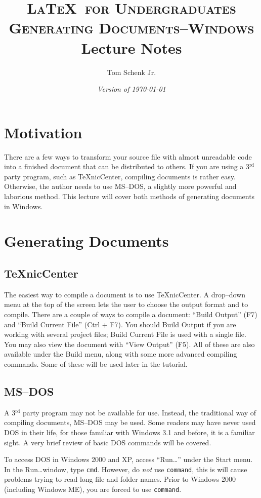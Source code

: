 \documentclass{article}
\title{\textsc{\LaTeX\ for Undergraduates\\
			Generating Documents--Windows} \\
			Lecture Notes}
\author{Tom Schenk Jr.}
\date{\textit{Version of \today}}
\begin{document}
\maketitle

\section{Motivation}

There are a few ways to transform your source file with almost unreadable code into a finished document that can be distributed to others. If you are using a 3$^{\textrm{rd}}$ party program, such as \TeX nicCenter, compiling documents is rather easy. Otherwise, the author needs to use MS--DOS, a slightly more powerful and laborious method. This lecture will cover both methods of generating documents in Windows.

\section{Generating Documents}

\subsection{\TeX nicCenter}

The easiest way to compile a document is to use \TeX nicCenter. A drop--down menu at the top of the screen lets the user to choose the output format and to compile. There are a couple of ways to compile a document: ``Build Output'' (F7) and ``Build Current File'' (Ctrl + F7). You should Build Output if you are working with several project files; Build Current File is used with a single file. You may also view the document with ``View Output'' (F5). All of these are also available under the Build menu, along with some more advanced compiling commands. Some of these will be used later in the tutorial.

\subsection{MS--DOS}

A 3$^{\textrm{rd}}$ party program may not be available for use. Instead, the traditional way of compiling documents, MS--DOS may be used. Some readers may have never used DOS in their life, for those familiar with Windows 3.1 and before, it is a familiar sight. A very brief review of basic DOS commands will be covered.

To access DOS in Windows 2000 and XP, access ``Run\ldots'' under the Start menu. In the Run\ldots window, type \texttt{cmd}. However, do \emph{not} use \texttt{command}, this is will cause problems trying to read long file and folder names. Prior to Windows 2000 (including Windows ME), you are forced to use \texttt{command}.
\end{document}
